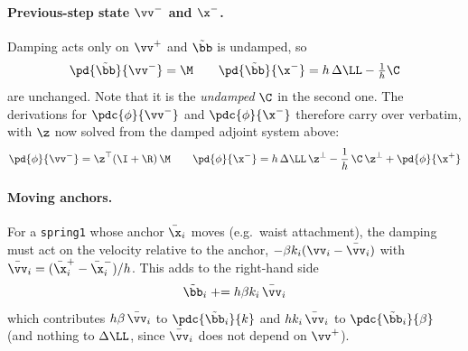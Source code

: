\begin{derivation}
\paragraph{Previous-step state $\vv^-$ and $\x^-$.} Damping acts only on $\vv^+$ and $\tilde\bb$ is undamped, so
\begin{equation*}
    \pd{\tilde\bb}{\vv^-} = \M
    \qquad
    \pd{\tilde\bb}{\x^-} = h\,\Delta\LL - \tfrac1h\C
\end{equation*}
are unchanged. Note that it is the \emph{undamped} $\C$ in the second one. The derivations for $\pdc{\phi}{\vv^-}$ and $\pdc{\phi}{\x^-}$ therefore carry over verbatim, with $\z$ now solved from the damped adjoint system above:
\begin{equation*}
    \pd{\phi}{\vv^-} = \z^\top(\I+\R)\,\M
    \qquad
    \pd{\phi}{\x^-} = h\,\Delta\LL\,\z^\perp - \frac1h\,\C\,\z^\perp + \pd{\phi}{\x^+}
\end{equation*}

\paragraph{Moving anchors.} For a \texttt{spring1} whose anchor $\bar\x_i$ moves (e.g.\ waist attachment), the damping must act on the velocity relative to the anchor, $-\beta k_i(\vv_i - \bar\vv_i)$ with $\bar\vv_i = (\bar\x_i^+ - \bar\x_i^-)/h$. This adds to the right-hand side
\begin{equation*}
    \tilde\bb_i \mathrel{+}= h\beta k_i\,\bar\vv_i
\end{equation*}
which contributes $h\beta\,\bar\vv_i$ to $\pdc{\tilde\bb_i}{k}$ and $h k_i\,\bar\vv_i$ to $\pdc{\tilde\bb_i}{\beta}$ (and nothing to $\Delta\LL$, since $\bar\vv_i$ does not depend on $\vv^+$).
\end{derivation}
